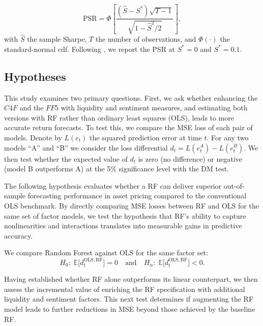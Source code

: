 \begin{equation}
\mathrm{PSR}= \Phi\left[\frac{\left(\hat{S}-S^{*}\right)\sqrt{T-1}}{\sqrt{1-\hat{S}^{2}/2}}\right],
\end{equation}
with $\hat{S}$ the sample Sharpe, $T$ the number of observations, and $\Phi(\cdot)$ the standard-normal cdf. Following , we report the PSR at $S^{*}=0$ and $S^{*}=0.1$.


\subsection{Hypotheses}
\label{subsec:hypotheses}

This study examines two primary questions.  First, we ask whether enhancing the $C4F$ and the $FF5$ with liquidity and sentiment measures, and estimating both versions with RF rather than ordinary least squares (OLS), leads to more accurate return forecasts.  To test this, we compare the MSE loss of each pair of models.  Denote by \(L(e_t)\) the squared prediction error at time \(t\). For any two models “A” and “B” we consider the loss differential \(d_t = L(e^{A}_t) - L(e^{B}_t)\).  We then test whether the expected value of \(d_t\) is zero (no difference) or negative (model B outperforms A) at the 5\% significance level with the DM test.

The following hypothesis evaluates whether a RF can deliver superior out-of-sample forecasting performance in asset pricing compared to the conventional OLS benchmark.  By directly comparing MSE losses between RF and OLS for the same set of factor models, we test the hypothesis that RF's ability to capture nonlinearities and interactions translates into measurable gains in predictive accuracy.
\setcounter{hyp}{0}

\begin{hyp} \label{hyp:dm2}
We compare Random Forest against OLS for the same factor set:
\[
H_{0}:\;\mathbb{E}\bigl[d^{\mathrm{OLS,RF}}_{t}\bigr]=0
\quad\text{and}\quad
H_{\alpha}:\;\mathbb{E}\bigl[d^{\mathrm{OLS,RF}}_{t}\bigr]<0.
\]
\end{hyp}

Having established whether RF alone outperforms its linear counterpart, we then assess the incremental value of enriching the RF specification with additional liquidity and sentiment factors.  This next test determines if augmenting the RF model leads to further reductions in MSE beyond those achieved by the baseline RF.

